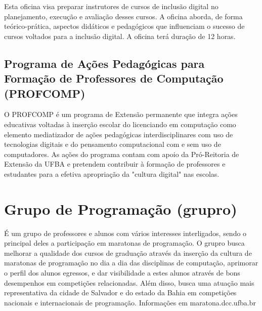 Esta oficina visa preparar instrutores de cursos de inclusão digital no planejamento, execução e avaliação desses cursos. A oficina aborda, de forma teórico-prática, aspectos didáticos e pedagógicos que influenciam o sucesso de cursos voltados para a inclusão digital. A oficina terá duração de 12 horas.  

\subsection{Programa de Ações Pedagógicas para Formação de Professores de Computação (PROFCOMP)}

O PROFCOMP é um programa de Extensão permanente que integra ações educativas voltadas à inserção escolar do licenciando em computação como elemento mediatizador de ações pedagógicas interdisciplinares com uso de tecnologias digitais e do pensamento computacional com e sem uso de computadores. As ações do programa contam com apoio da Pró-Reitoria de Extensão da UFBA e pretendem contribuir à formação de professores e estudantes para a efetiva apropriação da "cultura digital" nas escolas. 

\section{Grupo de Programação (grupro)}

É um grupo de professores e alunos com vários interesses interligados, sendo o principal deles a participação em maratonas de programação. O grupro busca melhorar a qualidade dos cursos de graduação através da inserção da cultura de maratonas de programação no dia a dia das disciplinas de computação, aprimorar o perfil dos alunos egressos, e dar visibilidade a estes alunos através de bons desempenhos em competições relacionadas. Além disso, busca uma atuação mais representativa da cidade de Salvador e do estado da Bahia em competições nacionais e internacionais de programação. Informações em maratona.dcc.ufba.br 